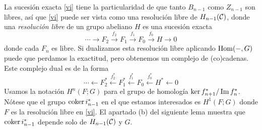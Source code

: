 \documentclass[TA.tex]{subfiles}
\begin{document}
La sucesión exacta \ref{vi} tiene la particularidad de que tanto $B_{n-1}$ como $Z_{n-1}$ son libres, así que \ref{vi} puede ser vista como una resolución libre de $H_{n-1}(\mathcal{C})$, donde una \emph{resolución libre} de un grupo abeliano $H$ es una sucesión exacta
\[
\cdots\to F_2\xrightarrow{f_2} F_1\xrightarrow{f_1} F_0\xrightarrow{f_0} H\to 0
\]
donde cada $F_n$ es libre. Si dualizamos esta resolución libre aplicando $\operatorname{Hom}(-,G)$ puede que perdamos la exactitud, pero obtenemos un complejo de (co)cadenas. Este complejo dual es de la forma
\[
\cdots\leftarrow F_2^*\xleftarrow{f_2^*} F_1^*\xleftarrow{f_1^*} F_0\xleftarrow{f_0^*} H^*\leftarrow 0
\]
Usamos la notación $H^n(F;G)$ para el grupo de homología $\ker f_{n+1}^*/\operatorname{Im} f_n^*$. Nótese que el grupo $\operatorname{coker} i_{n-1}^*$ en el que estamos interesados es $H^1(F;G)$ donde $F$ es la resolución libre en \ref{vi}. El apartado (b) del siguiente lema muestra que $\operatorname{coker} i_{n-1}^*$ depende solo de $H_{n-1}(\mathcal{C})$ y $G$.
\end{document}
